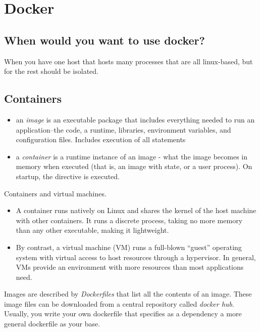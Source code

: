 \section{Docker}

\subsection{When would you want to use docker?}
When you have one host that hosts many processes that are all linux-based, but for the rest should be isolated. 

\subsection{Containers}

\begin{itemize}
    \item an \emph{image} is an executable package that includes everything needed to run an application--the code, a runtime, libraries, environment variables, and configuration files. Includes execution of all  statements
    \item a \emph{container} is a runtime instance of an image - what the image becomes in memory when executed (that is, an image with state, or a user process). On startup, the  directive is executed.
\end{itemize}


Containers and virtual machines.
\begin{itemize}
    \item A container runs natively on Linux and shares the kernel of the host machine with other containers. It runs a discrete process, taking no more memory than any other executable, making it lightweight.
    \item By contrast, a virtual machine (VM) runs a full-blown “guest” operating system with virtual access to host resources through a hypervisor. In general, VMs provide an environment with more resources than most applications need.
\end{itemize}

Images are described by \emph{Dockerfiles} that list all the contents of an image. These image files can be downloaded from a central repository called \emph{docker hub}.
Usually, you write your own dockerfile that specifies as a dependency a more general dockerfile as your base. 

